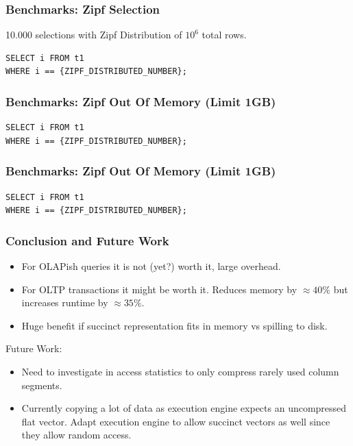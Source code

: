 \documentclass{beamer}
\begin{document}
\begin{frame}[fragile]
    \frametitle{Benchmarks: Zipf Selection}
10.000 selections with Zipf Distribution of $10^6$ total rows.

\begin{lstlisting}[style=SQL]
SELECT i FROM t1 
WHERE i == {ZIPF_DISTRIBUTED_NUMBER};
\end{lstlisting}
    

\end{frame}

\begin{frame}[fragile]
    \frametitle{Benchmarks: Zipf Out Of Memory (Limit 1GB)}
\begin{lstlisting}[style=SQL]
SELECT i FROM t1 
WHERE i == {ZIPF_DISTRIBUTED_NUMBER};
\end{lstlisting}
    

\end{frame}


\begin{frame}[fragile]
    \frametitle{Benchmarks: Zipf Out Of Memory (Limit 1GB)}
\begin{lstlisting}[style=SQL]
SELECT i FROM t1 
WHERE i == {ZIPF_DISTRIBUTED_NUMBER};
\end{lstlisting}
    

\end{frame}


\begin{frame}
    \frametitle{Conclusion and Future Work}

    \begin{itemize}
        \item For OLAPish queries it is not (yet?) worth it, large overhead.
        \item For OLTP transactions it might be worth it. Reduces memory by $\approx 40\%$ but increases runtime by $\approx 35\%$.
        \item Huge benefit if succinct representation fits in memory vs spilling to disk.
    \end{itemize}

    \vspace{0.5cm}
    \pause

    Future Work:
    \begin{itemize}
        \item Need to investigate in access statistics to only compress rarely used column segments.
        \item Currently copying a lot of data as execution engine expects an uncompressed flat vector. Adapt execution engine to allow 
        succinct vectors as well since they allow random access. 
    \end{itemize}
\end{frame}
\end{document}
